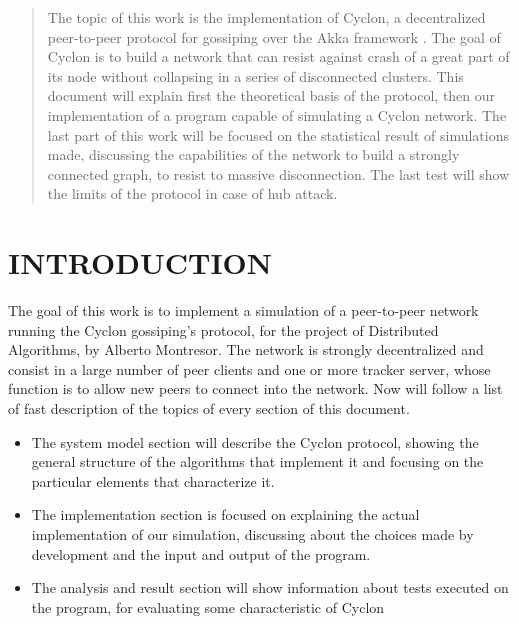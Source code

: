 \documentclass[a4paper,12pt,notitlepage]{article} %
\begin{document}

\begin{abstract}
   	 	
    The topic of this work is the implementation of Cyclon, a decentralized
    peer-to-peer protocol for gossiping over the Akka framework \cite{Akka}.
    The goal of Cyclon is to build a network that can resist against crash of 
    a great part of its node without  collapsing in a series of disconnected clusters.
    This document will explain first the theoretical basis of the protocol, then 
    our implementation of a program capable of simulating a Cyclon network. 
    The last part of this work will be focused on the statistical
    result of simulations made, discussing the capabilities of the network
    to build a strongly connected graph, to resist to massive disconnection. The 
    last test will show the limits of the protocol in case of hub attack.
  

\end{abstract}
\newpage



\section{INTRODUCTION}

The goal of this work is to implement a simulation of a peer-to-peer network running
 the Cyclon gossiping's protocol, for the project of Distributed Algorithms, by Alberto Montresor. 
 The network is strongly decentralized and consist in a 
 large number of peer clients and one or more tracker server, whose function is to allow new 
 peers to connect into the network. Now will follow a list of fast description of the topics of every
 section of this document.

 \begin{itemize}
 	\item The system model section will describe the Cyclon protocol, showing  the general structure of 
 	the algorithms that implement it and focusing on the particular elements that characterize it.
 	\item The implementation section is focused on explaining the actual implementation of 
 	our simulation, discussing about the choices made by development and the input and
 	 output of the program.
 	\item The analysis and result section will show information about tests executed on 
 	the program, for evaluating some characteristic of Cyclon
 \end{itemize}
\end{document}
